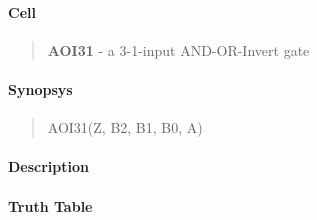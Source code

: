 \label{AOI31}
\paragraph{Cell}
\begin{quote}
    \textbf{AOI31} - a 3-1-input AND-OR-Invert gate
\end{quote}

\paragraph{Synopsys}
\begin{quote}
    AOI31(Z, B2, B1, B0, A)
\end{quote}

\paragraph{Description}



\paragraph{Truth Table}


